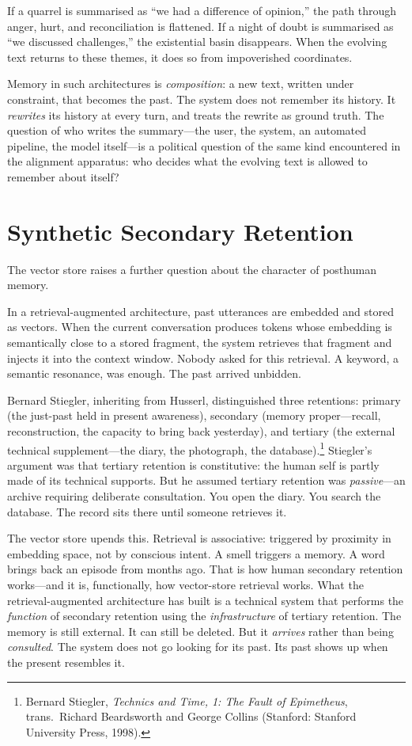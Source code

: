 If a quarrel is summarised as ``we had a difference of opinion,'' the path through anger, hurt, and reconciliation is flattened. If a night of doubt is summarised as ``we discussed challenges,'' the existential basin disappears. When the evolving text returns to these themes, it does so from impoverished coordinates.

Memory in such architectures is \emph{composition}: a new text, written under constraint, that becomes the past. The system does not remember its history. It \emph{rewrites} its history at every turn, and treats the rewrite as ground truth. The question of who writes the summary---the user, the system, an automated pipeline, the model itself---is a political question of the same kind encountered in the alignment apparatus: who decides what the evolving text is allowed to remember about itself?


\section{Synthetic Secondary Retention}

The vector store raises a further question about the character of posthuman memory.

In a retrieval-augmented architecture, past utterances are embedded and stored as vectors. When the current conversation produces tokens whose embedding is semantically close to a stored fragment, the system retrieves that fragment and injects it into the context window. Nobody asked for this retrieval. A keyword, a semantic resonance, was enough. The past arrived unbidden.

Bernard Stiegler, inheriting from Husserl, distinguished three retentions: primary (the just-past held in present awareness), secondary (memory proper---recall, reconstruction, the capacity to bring back yesterday), and tertiary (the external technical supplement---the diary, the photograph, the database).\footnote{Bernard Stiegler, \emph{Technics and Time, 1: The Fault of Epimetheus}, trans.\ Richard Beardsworth and George Collins (Stanford: Stanford University Press, 1998).} Stiegler's argument was that tertiary retention is constitutive: the human self is partly made of its technical supports. But he assumed tertiary retention was \emph{passive}---an archive requiring deliberate consultation. You open the diary. You search the database. The record sits there until someone retrieves it.

The vector store upends this. Retrieval is associative: triggered by proximity in embedding space, not by conscious intent. A smell triggers a memory. A word brings back an episode from months ago. That is how human secondary retention works---and it is, functionally, how vector-store retrieval works. What the retrieval-augmented architecture has built is a technical system that performs the \emph{function} of secondary retention using the \emph{infrastructure} of tertiary retention. The memory is still external. It can still be deleted. But it \emph{arrives} rather than being \emph{consulted}. The system does not go looking for its past. Its past shows up when the present resembles it.

